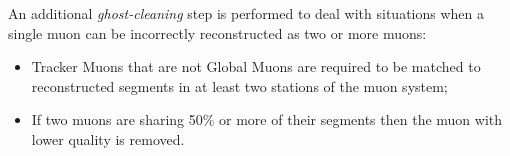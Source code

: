 An additional \textit{ghost-cleaning} step is performed to deal with situations when a single muon
can be incorrectly reconstructed as two or more muons:

\begin{itemize}

\item Tracker Muons that are not Global Muons are required to be matched to reconstructed segments in at least two stations of the muon system;
\item If two muons are sharing 50\% or more of their segments then the muon with lower quality is removed.

\end{itemize}
